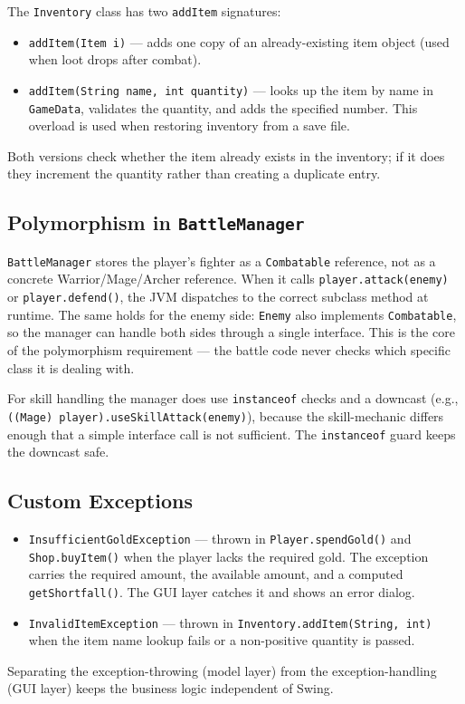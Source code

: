 \documentclass[12pt,a4paper]{article}
\begin{document}
The \texttt{Inventory} class has two \texttt{addItem} signatures:
\begin{itemize}[leftmargin=*]
    \item \texttt{addItem(Item i)} --- adds one copy of an already-existing item object (used when loot drops after combat).
    \item \texttt{addItem(String name, int quantity)} --- looks up the item by name in \texttt{GameData}, validates the quantity, and adds the specified number. This overload is used when restoring inventory from a save file.
\end{itemize}
Both versions check whether the item already exists in the inventory; if it does they increment the quantity rather than creating a duplicate entry.

\subsection*{Polymorphism in \texttt{BattleManager}}

\texttt{BattleManager} stores the player's fighter as a \texttt{Combatable} reference, not as a concrete Warrior/Mage/Archer reference. When it calls \texttt{player.attack(enemy)} or \texttt{player.defend()}, the JVM dispatches to the correct subclass method at runtime. The same holds for the enemy side: \texttt{Enemy} also implements \texttt{Combatable}, so the manager can handle both sides through a single interface. This is the core of the polymorphism requirement --- the battle code never checks which specific class it is dealing with.

For skill handling the manager does use \texttt{instanceof} checks and a downcast (e.g., \texttt{((Mage) player).useSkillAttack(enemy)}), because the skill-mechanic differs enough that a simple interface call is not sufficient. The \texttt{instanceof} guard keeps the downcast safe.

\subsection*{Custom Exceptions}

\begin{itemize}[leftmargin=*]
    \item \texttt{InsufficientGoldException} --- thrown in \texttt{Player.spendGold()} and \texttt{Shop.buyItem()} when the player lacks the required gold. The exception carries the required amount, the available amount, and a computed \texttt{getShortfall()}. The GUI layer catches it and shows an error dialog.
    \item \texttt{InvalidItemException} --- thrown in \texttt{Inventory.addItem(String, int)} when the item name lookup fails or a non-positive quantity is passed.
\end{itemize}
Separating the exception-throwing (model layer) from the exception-handling (GUI layer) keeps the business logic independent of Swing.
\end{document}
